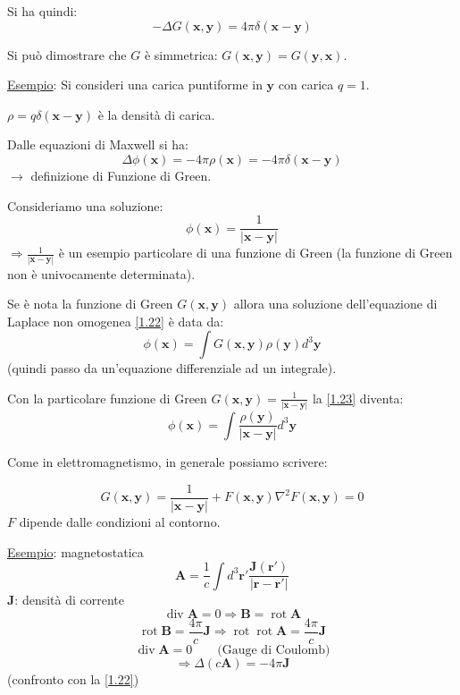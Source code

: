 \documentclass[a4paper,11pt]{report}
\newcommand{\vect}[1]{\boldsymbol{#1}}
\newcommand{\x}{\boldsymbol{x}}
\newcommand{\y}{\boldsymbol{y}}
\begin{document}
Si ha quindi:
\begin{equation}
-\Delta G(\x,\y)=4\pi\delta(\x-\y)
\end{equation}

Si pu\`o dimostrare che $G$ \`e simmetrica: $G(\x,\y)=G(\y,\x)$.

\medskip

\underline{Esempio}: Si consideri una carica puntiforme in $\y$ con carica $q=1$. 

$\rho=q\delta(\x-\y)$ \`e la densit\`a di carica. 

Dalle equazioni di Maxwell si ha:
\begin{equation}
\Delta \phi(\x)=-4\pi\rho(\x)=-4\pi\delta(\x-\y)
\label{1.22}
\end{equation}
$\rightarrow$ definizione di Funzione di Green.

Consideriamo una soluzione:
\[\phi(\x)=\frac{1}{|\x-\y|}
\]
$\Rightarrow \frac{1}{|\x-\y|}$ \`e un esempio particolare di una funzione di Green (la funzione di Green non \`e univocamente determinata).

Se \`e nota la funzione di Green $G(\x, \y)$ allora una soluzione dell'equazione di Laplace non omogenea \eqref{1.22} \`e data da:
\begin{equation}
\phi(\x)=\int G(\x,\y)\rho(\y)d^3\y
\label{1.23}
\end{equation}
(quindi passo da un'equazione differenziale ad un integrale).

Con la particolare funzione di Green $G(\x, \y)=\frac{1}{|\x-\y|}$ la \eqref{1.23} diventa:
\[
\phi(\x)=\int\frac{\rho(\y)}{|\x-\y|} d^3\y
\]

Come in elettromagnetismo, in generale possiamo scrivere:

\begin{subequations}
\begin{equation}
G(\x,\y)=\frac{1}{|\x-\y|}+F(\x,\y)
\end{equation}
\begin{equation}
\nabla^2F(\x,\y)=0
\end{equation}
\end{subequations}
$F$ dipende dalle condizioni al contorno.

\medskip

\underline{Esempio}: magnetostatica
\[
\vect{A}=\frac{1}{c}\int d^3 \vect{r}' \frac{\vect{J}(\vect{r}')}{|\vect{r}-\vect{r}'|}
\]
$\vect{J}$: densit\`a di corrente
\[
\operatorname{div} \vect{A}=0 \Rightarrow \vect{B}=\operatorname{rot} \vect{A}
\]
\[
\operatorname{rot} \vect{B} = \frac{4 \pi}{c} \vect{J} \Rightarrow \operatorname{rot} \operatorname{rot} \vect{A} = \frac{4 \pi}{c} \vect{J}
\]
\[
\operatorname{div} \vect{A}=0 \qquad\text{(Gauge di Coulomb)}
\]
\[
\Rightarrow \Delta (c\vect{A})=-4\pi \vect{J}
\]
(confronto con la \eqref{1.22})
\end{document}
